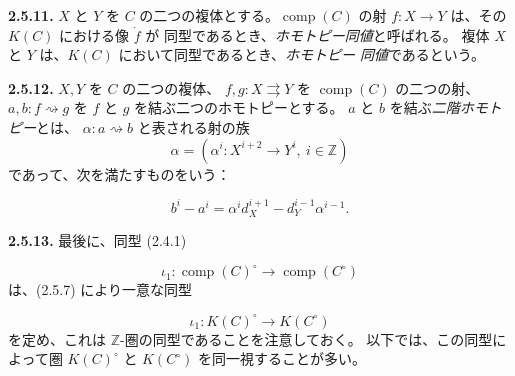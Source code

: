 %
\noindent\textbf{2.5.11.}\quad
{}
$X$ と $Y$ を $C$ の二つの複体とする。$\operatorname{comp}(C)$ の射
$f\colon X\longrightarrow Y$ は、その $K(C)$ における像 $\dot f$ が
同型であるとき、\emph{ホモトピー同値}と呼ばれる。
複体 $X$ と $Y$ は、$K(C)$ において同型であるとき、\emph{ホモトピー
同値}であるという。

\noindent\textbf{2.5.12.}\quad
{}
$X,Y$ を $C$ の二つの複体、
$f,g\colon X\rightrightarrows Y$ を $\operatorname{comp}(C)$ の二つの射、
$a,b\colon f\rightsquigarrow g$ を $f$ と $g$ を結ぶ二つのホモトピーとする。
$a$ と $b$ を結ぶ\emph{二階ホモトピー}とは、
$\alpha\colon a\rightsquigarrow b$ と表される射の族
\[
  \alpha=(\alpha^i\colon X^{i+2}\longrightarrow Y^i,\ i\in\mathbb Z)
\]
であって、次を満たすものをいう：

\begin{equation}
  b^i-a^i
  =\alpha^i d_X^{i+1}-d_Y^{i-1}\alpha^{i-1}.
  \tag{2.5.12.1}
\end{equation}

\noindent\textbf{2.5.13.}\quad
最後に、同型 (2.4.1)

\begin{equation*}
  \iota_1\colon
  \operatorname{comp}(C)^\circ
  \longrightarrow
  \operatorname{comp}(C^\circ)
\end{equation*}
は、(2.5.7) により一意な同型

\begin{equation*}
  \iota_1\colon
  K(C)^\circ
  \longrightarrow
  K(C^\circ)
\end{equation*}
を定め、これは $\mathbb Z$-圏の同型であることを注意しておく。
以下では、この同型によって圏 $K(C)^\circ$ と $K(C^\circ)$ を同一視することが多い。
